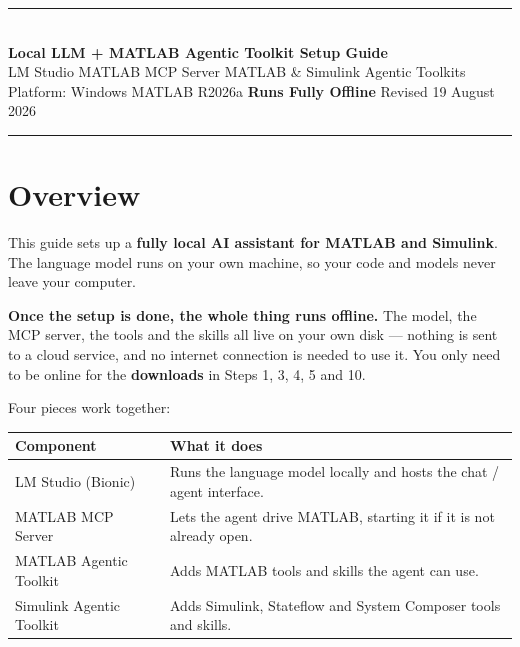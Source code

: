 \documentclass[11pt, letterpaper]{article}
\begin{document}

\begin{center}
  \color{TSorange}\rule{\textwidth}{2pt}\\[5pt]
  {\fontsize{18}{22}\selectfont\bfseries\color{TSdark}
    Local LLM + MATLAB Agentic Toolkit Setup Guide}\\[4pt]
  {\small\color{TSgray}
    LM Studio \textendash{} MATLAB MCP Server \textendash{} MATLAB \& Simulink Agentic Toolkits}\\[2pt]
  {\small\color{TSgray}
    Platform: Windows \quad\textbar\quad MATLAB R2026a
    \quad\textbar\quad \textbf{Runs Fully Offline}
    \quad\textbar\quad Revised 19 August 2026}\\[5pt]
  \color{TSorange}\rule{\textwidth}{2pt}
\end{center}

\vspace{6pt}

\section*{Overview}

This guide sets up a \textbf{fully local AI assistant for MATLAB and Simulink}. The language model
runs on your own machine, so your code and models never leave your computer.

\begin{notebox}
  \textbf{Once the setup is done, the whole thing runs offline.} The model, the MCP server, the
  tools and the skills all live on your own disk --- nothing is sent to a cloud service, and no
  internet connection is needed to use it. You only need to be online for the \textbf{downloads}
  in Steps 1, 3, 4, 5 and 10.
\end{notebox}

Four pieces work together:

\begin{center}
\small
\begin{tabular}{@{}>{\raggedright\arraybackslash}p{} >{\raggedright\arraybackslash}p{}@{}}
\toprule
\textbf{Component} & \textbf{What it does} \\
\midrule
LM Studio (Bionic)          & Runs the language model locally and hosts the chat / agent interface. \\
MATLAB MCP Server           & Lets the agent drive MATLAB, starting it if it is not already open. \\
MATLAB Agentic Toolkit      & Adds MATLAB tools and skills the agent can use. \\
Simulink Agentic Toolkit    & Adds Simulink, Stateflow and System Composer tools and skills. \\
\bottomrule
\end{tabular}
\end{center}
\end{document}
